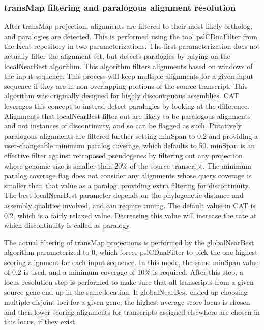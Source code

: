 \documentclass[fleqn,10pt]{wlscirep}
\begin{document}
\subsubsection*{transMap filtering and paralogous alignment resolution}
	After transMap projection, alignments are filtered to their most likely ortholog, and paralogies are detected. This is performed using the tool pslCDnaFilter from the Kent repository in two parameterizations. The first parameterization does not actually filter the alignment set, but detects paralogies by relying on the localNearBest algorithm. This algorithm filters alignments based on windows of the input sequence. This process will keep multiple alignments for a given input sequence if they are in non-overlapping portions of the source transcript. This algorithm was originally designed for highly discontiguous assemblies. CAT leverages this concept to instead detect paralogies by looking at the difference. Alignments that localNearBest filter out are likely to be paralogous alignments and not instances of discontinuity, and so can be flagged as such. Putatively paralogous alignments are filtered further setting minSpan to 0.2 and providing a user-changeable minimum paralog coverage, which defaults to 50. minSpan is an effective filter against retroposed pseudogenes by filtering out any projection whose genomic size is smaller than 20\% of the source transcript. The minimum paralog coverage flag does not consider any alignments whose query coverage is smaller than that value as a paralog, providing extra filtering for discontinuity. The best localNearBest parameter depends on the phylogenetic distance and assembly qualities involved, and can require tuning. The default value in CAT is 0.2, which is a fairly relaxed value. Decreasing this value will increase the rate at which discontinuity is called as paralogy.
    
	The actual filtering of transMap projections is performed by the globalNearBest algorithm parameterized to 0, which forces pslCDnaFilter to pick the one highest scoring alignment for each input sequence. In this mode, the same minSpan value of 0.2 is used, and a minimum coverage of 10\% is required. After this step, a locus resolution step is performed to make sure that all transcripts from a given source gene end up in the same location. If globalNearBest ended up choosing multiple disjoint loci for a given gene, the highest average score locus is chosen and then lower scoring alignments for transcripts assigned elsewhere are chosen in this locus, if they exist.
\end{document}
